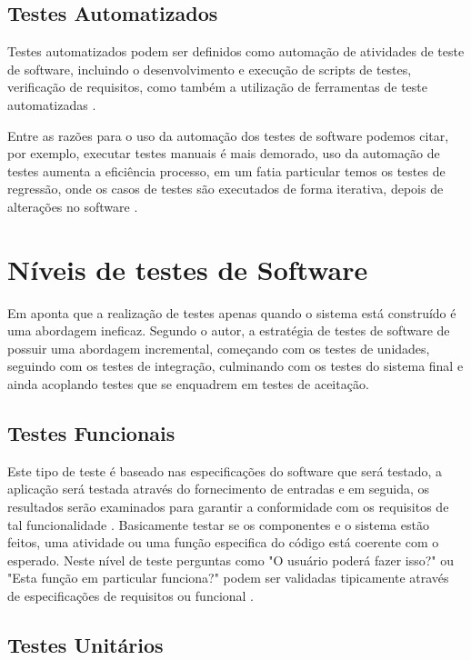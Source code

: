 \subsection{Testes Automatizados}

Testes automatizados podem ser definidos como automação de atividades de teste de software, incluindo o desenvolvimento e execução de scripts de testes, verificação de requisitos, como também a utilização de ferramentas de teste automatizadas \cite{Dustin1999}.
 
Entre as razões para o uso da automação dos testes de software podemos citar, por exemplo, executar testes manuais é mais demorado, uso da automação de testes aumenta a  eficiência processo, em um fatia particular temos os testes de regressão, onde os casos de testes são executados de forma iterativa, depois de alterações no software \cite{Dustin1999}.
		
\section{Níveis de testes de Software}

Em \cite{Pressman2002} aponta que a realização de testes apenas quando o sistema está construído é uma abordagem ineficaz. Segundo o autor, a estratégia de testes de software de possuir uma abordagem incremental, começando com os testes de unidades, seguindo com os testes de integração, culminando com os testes do sistema final e ainda acoplando testes que se enquadrem em testes de aceitação.

\subsection{Testes Funcionais}

Este tipo de teste é baseado nas especificações do software que será testado, a aplicação será testada através do fornecimento de entradas e em seguida, os resultados serão examinados para garantir a conformidade com os requisitos de tal funcionalidade \cite{tutorialsPoint}. Basicamente testar se os componentes e o sistema estão feitos, uma atividade ou uma função especifica do código está coerente com o esperado. Neste nível de teste perguntas como "O usuário poderá fazer isso?" ou "Esta função em particular funciona?" podem ser validadas tipicamente através de especificações de requisitos ou funcional \cite{Leung1990}. 

\subsection{Testes Unitários}

